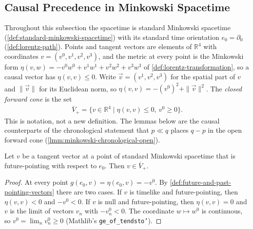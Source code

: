 \subsection{Causal Precedence in Minkowski Spacetime}\label{sbsctn:causal-precedence-minkowski}

Throughout this subsection the spacetime is standard Minkowski spacetime (\ref{def:standard-minkowski-spacetime}) with its standard time orientation $e_0 = \partial_0$ (\ref{def:lorentz-path}). Points and tangent vectors are elements of $\mathbb{R}^4$ with coordinates $v = (v^0, v^1, v^2, v^3)$, and the metric at every point is the Minkowski form $\eta(v,w) = -v^0w^0 + v^1w^1 + v^2w^2 + v^3w^3$ of \ref{def:lorentz-transformation}, so a causal vector has $\eta(v,v) \le 0$. Write $\vec v = (v^1, v^2, v^3)$ for the spatial part of $v$ and $\|\vec v\|$ for its Euclidean norm, so $\eta(v,v) = -(v^0)^2 + \|\vec v\|^2$. The \emph{closed forward cone} is the set
\begin{align}
    \overline{V}_+ = \{ v \in \mathbb{R}^4 \mid \eta(v,v) \le 0,\ v^0 \ge 0 \}.
\end{align}
This is notation, not a new definition. The lemmas below are the causal counterparts of the chronological statement that $p \ll q$ places $q - p$ in the open forward cone (\ref{lmm:minkowski-chronological-open}).

\begin{lemma}
    \label{lmm:minkowski-future-pointing-closed-cone}
    \leanok
    Let $v$ be a tangent vector at a point of standard Minkowski spacetime that is future-pointing with respect to $e_0$. Then $v \in \overline{V}_+$.
\end{lemma}
\begin{proof}
    \leanok
    At every point $g(e_0, v) = \eta(e_0, v) = -v^0$. By \ref{def:future-and-past-pointing-vectors} there are two cases. If $v$ is timelike and future-pointing, then $\eta(v,v) < 0$ and $-v^0 < 0$. If $v$ is null and future-pointing, then $\eta(v,v) = 0$ and $v$ is the limit of vectors $v_n$ with $-v_n^0 < 0$. The coordinate $w \mapsto w^0$ is continuous, so $v^0 = \lim_n v_n^0 \ge 0$ (Mathlib's \texttt{ge\_of\_tendsto'}).
\end{proof}

